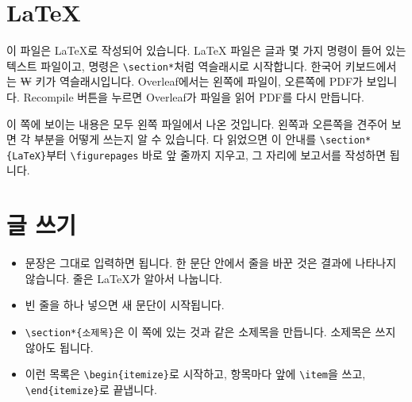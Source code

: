 \documentclass[11pt]{article}
\begin{document}
\makeheader


\section*{LaTeX}

이 파일은 LaTeX로 작성되어 있습니다. LaTeX 파일은 글과 몇 가지 명령이 들어 있는
텍스트 파일이고, 명령은 \verb|\section*|처럼 역슬래시로 시작합니다. 한국어
키보드에서는 ₩ 키가 역슬래시입니다. Overleaf에서는 왼쪽에 파일이, 오른쪽에 PDF가
보입니다. Recompile 버튼을 누르면 Overleaf가 파일을 읽어 PDF를 다시 만듭니다.

이 쪽에 보이는 내용은 모두 왼쪽 파일에서 나온 것입니다. 왼쪽과 오른쪽을 견주어
보면 각 부분을 어떻게 쓰는지 알 수 있습니다. 다 읽었으면 이 안내를
\verb|\section*{LaTeX}|부터 \verb|\figurepages| 바로 앞 줄까지 지우고, 그 자리에
보고서를 작성하면 됩니다.

\section*{글 쓰기}

\begin{itemize}
  \item 문장은 그대로 입력하면 됩니다. 한 문단 안에서 줄을 바꾼 것은 결과에
    나타나지 않습니다. 줄은 LaTeX가 알아서 나눕니다.
  \item 빈 줄을 하나 넣으면 새 문단이 시작됩니다.
  \item \verb|\section*{소제목}|은 이 쪽에 있는 것과 같은 소제목을 만듭니다.
    소제목은 쓰지 않아도 됩니다.
  \item 이런 목록은 \verb|\begin{itemize}|로 시작하고, 항목마다 앞에
    \verb|\item|을 쓰고, \verb|\end{itemize}|로 끝냅니다.
\end{itemize}
\end{document}
